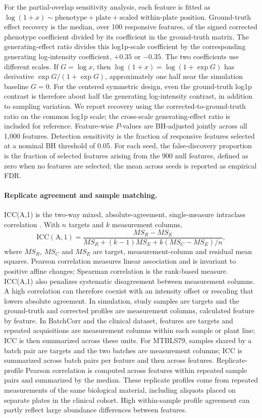 \documentclass[namedate,webpdf,modern,large,nocrop]{oup-authoring-template}
\begin{document}
For the partial-overlap sensitivity analysis, each feature is fitted as \(\log(1+x)\sim\text{phenotype}+\text{plate}+\text{scaled within-plate position}\). Ground-truth effect recovery is the median, over 100 responsive features, of the signed corrected phenotype coefficient divided by its coefficient in the ground-truth matrix. The generating-effect ratio divides this log1p-scale coefficient by the corresponding generating log-intensity coefficient, \(+0.35\) or \(-0.35\). The two coefficients use different scales. If \(G=\log x\), then \(\log(1+x)=\log(1+\exp G)\) has derivative \(\exp G/(1+\exp G)\), approximately one half near the simulation baseline \(G=0\). For the centered symmetric design, even the ground-truth log1p contrast is therefore about half the generating log-intensity contrast, in addition to sampling variation. We report recovery using the corrected-to-ground-truth ratio on the common log1p scale; the cross-scale generating-effect ratio is included for reference. Feature-wise \(P\)-values are BH-adjusted jointly across all 1,000 features. Detection sensitivity is the fraction of responsive features selected at a nominal BH threshold of 0.05. For each seed, the false-discovery proportion is the fraction of selected features arising from the 900 null features, defined as zero when no features are selected; the mean across seeds is reported as empirical FDR.

\paragraph{Replicate agreement and sample matching.} ICC(A,1) is the two-way mixed, absolute-agreement, single-measure intraclass correlation \citep{McGrawWong1996}. With \(n\) targets and \(k\) measurement columns,
\[
\operatorname{ICC(A,1)}=\frac{MS_R-MS_E}{MS_R+(k-1)MS_E+k(MS_C-MS_E)/n},
\]
where \(MS_R\), \(MS_C\) and \(MS_E\) are target, measurement-column and residual mean squares. Pearson correlation measures linear association and is invariant to positive affine changes; Spearman correlation is the rank-based measure. ICC(A,1) also penalizes systematic disagreement between measurement columns. A high correlation can therefore coexist with an intensity offset or rescaling that lowers absolute agreement. In simulation, study samples are targets and the ground-truth and corrected profiles are measurement columns, calculated feature by feature. In BatchCorr and the clinical dataset, features are targets and repeated acquisitions are measurement columns within each sample or plant line; ICC is then summarized across these units. For MTBLS79, samples shared by a batch pair are targets and the two batches are measurement columns; ICC is summarized across batch pairs per feature and then across features. Replicate-profile Pearson correlation is computed across features within repeated sample pairs and summarized by the median. These replicate profiles come from repeated measurements of the same biological material, including aliquots placed on separate plates in the clinical cohort. High within-sample profile agreement can partly reflect large abundance differences between features.
\end{document}
